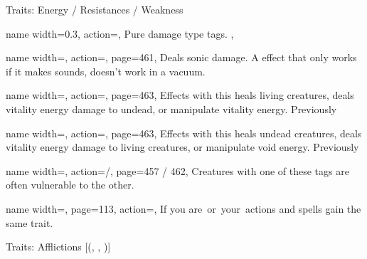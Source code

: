 \begin{PageFrontLandscape}
\begin{TablesHalf}{\frontTableHeight}
        \TableSpace
        \begin{Table}{Traits: Energy / Resistances / Weakness}
            \begin{entry}{}{%
                name width=0.3,%
                action=\stackbox[l][c]{\Acid\Cold\Electricity\Fire\Force}, }
                Pure damage type tags. ,
            \end{entry}
            \begin{entry}{}{%
                name width=\conditionLength,%
                action=\Sonic,
                page=461,
            }
                Deals sonic damage.
                A effect that only works if it makes sounds, doesn't work in a vacuum. \hfill
            \end{entry}
            \begin{entry}{}{%
                name width=\conditionLength,%
                action=\Vitality,
                page=463,
            }
                Effects with this heals living creatures, deals vitality energy damage to undead, or manipulate vitality energy.\hfill
                Previously \Positive
            \end{entry}
            \begin{entry}{}{%
                name width=\conditionLength,%
                action=\Void,
                page=463,
            }
                Effects with this heals undead creatures, deals vitality energy damage to living creatures, or manipulate void energy. \hfill
                Previously \Negative
            \end{entry}
            \begin{entry}{}{%
                name width=\conditionLength,%
                action=\Holy /\Unholy,
                page=457 / 462,
            }
                Creatures with one of these tags are often vulnerable to the other.
            \end{entry}
            \begin{entry}{}{%
                name width=\conditionLength,%
                page=113,
                action=\Sanctified,
            }
                If you are \Holy\,or \Unholy\,your \Sanctified\,actions and spells gain the same trait.
            \end{entry}
        \end{Table}
        \TableSpace
        \begin{Table}{Traits: Afflictions }[{(, , )}]

\end{Table}
\end{TablesHalf}
\end{PageFrontLandscape}
